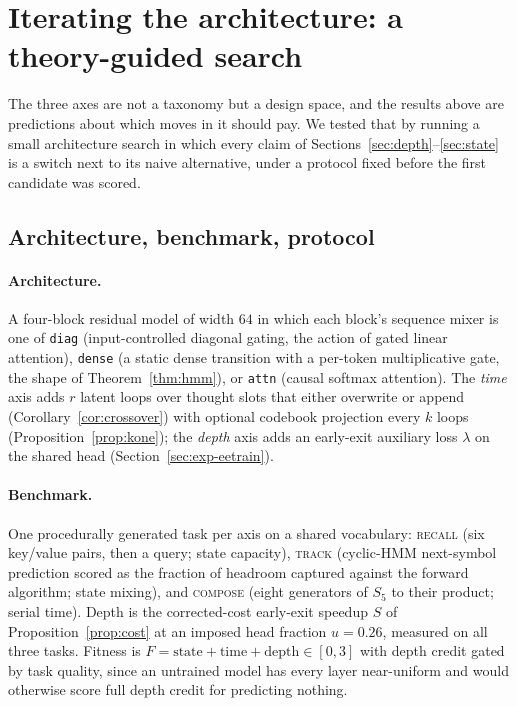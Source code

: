 \section{Iterating the architecture: a theory-guided search}
\label{sec:search}

The three axes are not a taxonomy but a design space, and the results above
are predictions about which moves in it should pay. We tested that by running
a small architecture search in which every claim of
Sections~\ref{sec:depth}--\ref{sec:state} is a switch next to its naive
alternative, under a protocol fixed before the first candidate was scored.

\subsection{Architecture, benchmark, protocol}

\paragraph{Architecture.} A four-block residual model of width $64$ in which
each block's sequence mixer is one of \texttt{diag} (input-controlled diagonal
gating, the action of gated linear attention), \texttt{dense} (a static
dense transition with a per-token multiplicative gate, the shape of
Theorem~\ref{thm:hmm}), or \texttt{attn} (causal softmax attention). The
\emph{time} axis adds $r$ latent loops over thought slots that either
overwrite or append (Corollary~\ref{cor:crossover}) with optional codebook
projection every $k$ loops (Proposition~\ref{prop:kone}); the \emph{depth}
axis adds an early-exit auxiliary loss $\lambda$ on the shared head
(Section~\ref{sec:exp-eetrain}).

\paragraph{Benchmark.} One procedurally generated task per axis on a shared
vocabulary: \textsc{recall} (six key/value pairs, then a query; state
capacity), \textsc{track} (cyclic-HMM next-symbol prediction scored as the
fraction of headroom captured against the forward algorithm; state mixing),
and \textsc{compose} (eight generators of $S_5$ to their product; serial
time). Depth is the corrected-cost early-exit speedup $S$ of
Proposition~\ref{prop:cost} at an imposed head fraction $u = 0.26$, measured
on all three tasks. Fitness is $F = \text{state} + \text{time} + \text{depth}
\in [0,3]$ with depth credit gated by task quality, since an untrained model
has every layer near-uniform and would otherwise score full depth credit for
predicting nothing.

